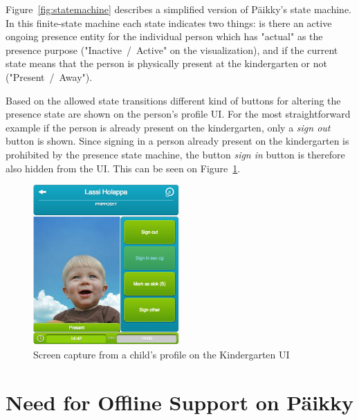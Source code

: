 Figure~\ref{fig:statemachine} describes a simplified version of Päikky's state machine. In this finite-state machine each state indicates two things: is there an active ongoing presence entity for the individual person which has "actual" as the presence purpose ("Inactive~/~Active" on the visualization), and if the current state means that the person is physically present at the kindergarten or not ("Present~/~Away").

Based on the allowed state transitions different kind of buttons for altering the presence state are shown on the person's profile UI. For the most straightforward example if the person is already present on the kindergarten, only a \textit{sign out} button is shown. Since signing in a person already present on the kindergarten is prohibited by the presence state machine, the button \textit{sign in} button is therefore also hidden from the UI. This can be seen on Figure~\ref{fig:child-profile}. 


\begin{figure}[t]
\begin{center}
\includegraphics[width=0.5\textwidth]{assets/child-profile.png}
\end{center}
\caption{Screen capture from a child's profile on the Kindergarten UI}
\label{fig:child-profile}
\end{figure}







\section{Need for Offline Support on Päikky}
\label{sec:need-for-offline-support}

